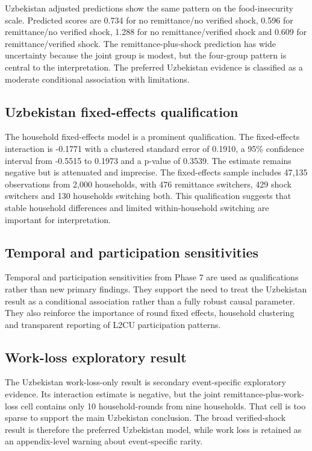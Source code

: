 \documentclass[11pt]{article}
\begin{document}
Uzbekistan adjusted predictions show the same pattern on the food-insecurity scale. Predicted scores are 0.734 for no remittance/no verified shock, 0.596 for remittance/no verified shock, 1.288 for no remittance/verified shock and 0.609 for remittance/verified shock. The remittance-plus-shock prediction has wide uncertainty because the joint group is modest, but the four-group pattern is central to the interpretation. The preferred Uzbekistan evidence is classified as a moderate conditional association with limitations.

\subsection{Uzbekistan fixed-effects qualification}

The household fixed-effects model is a prominent qualification. The fixed-effects interaction is -0.1771 with a clustered standard error of 0.1910, a 95\% confidence interval from -0.5515 to 0.1973 and a p-value of 0.3539. The estimate remains negative but is attenuated and imprecise. The fixed-effects sample includes 47,135 observations from 2,000 households, with 476 remittance switchers, 429 shock switchers and 130 households switching both. This qualification suggests that stable household differences and limited within-household switching are important for interpretation.

\subsection{Temporal and participation sensitivities}

Temporal and participation sensitivities from Phase 7 are used as qualifications rather than new primary findings. They support the need to treat the Uzbekistan result as a conditional association rather than a fully robust causal parameter. They also reinforce the importance of round fixed effects, household clustering and transparent reporting of L2CU participation patterns.

\subsection{Work-loss exploratory result}

The Uzbekistan work-loss-only result is secondary event-specific exploratory evidence. Its interaction estimate is negative, but the joint remittance-plus-work-loss cell contains only 10 household-rounds from nine households. That cell is too sparse to support the main Uzbekistan conclusion. The broad verified-shock result is therefore the preferred Uzbekistan model, while work loss is retained as an appendix-level warning about event-specific rarity.
\end{document}
